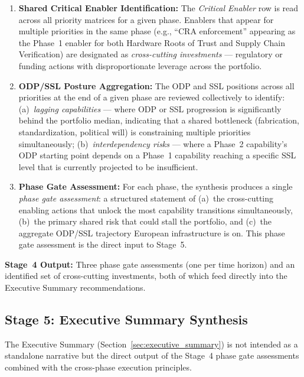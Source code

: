 \documentclass{ieeeaccess}
\begin{document}
\begin{enumerate}
    \item \textbf{Shared Critical Enabler Identification:}
    The \emph{Critical Enabler} row is read across all priority matrices for
    a given phase. Enablers that appear for multiple priorities in the same
    phase (e.g., ``CRA enforcement'' appearing as the Phase~1 enabler for both
    Hardware Roots of Trust and Supply Chain Verification) are designated as
    \emph{cross-cutting investments} --- regulatory or funding actions with
    disproportionate leverage across the portfolio.

    \item \textbf{ODP/SSL Posture Aggregation:}
    The ODP and SSL positions across all priorities at the end of a given
    phase are reviewed collectively to identify:
    (a)~\emph{lagging capabilities} --- where ODP or SSL progression is
    significantly behind the portfolio median, indicating that a shared
    bottleneck (fabrication, standardization, political will) is constraining
    multiple priorities simultaneously;
    (b)~\emph{interdependency risks} --- where a Phase~2 capability's ODP
    starting point depends on a Phase~1 capability reaching a specific SSL
    level that is currently projected to be insufficient.

    \item \textbf{Phase Gate Assessment:}
    For each phase, the synthesis produces a single \emph{phase gate
    assessment}: a structured statement of (a)~the cross-cutting enabling
    actions that unlock the most capability transitions simultaneously,
    (b)~the primary shared risk that could stall the portfolio, and
    (c)~the aggregate ODP/SSL trajectory European infrastructure is on. This
    phase gate assessment is the direct input to Stage~5.
\end{enumerate}

\noindent\textbf{Stage~4 Output:} Three phase gate assessments (one per time
horizon) and an identified set of cross-cutting investments, both of which
feed directly into the Executive Summary recommendations.

\subsection{Stage 5: Executive Summary Synthesis}
\label{sec:exec}
The Executive Summary (Section~\ref{sec:executive_summary}) is not intended as a
standalone narrative but the direct output of the Stage~4 phase gate
assessments combined with the cross-phase execution principles.
\end{document}
